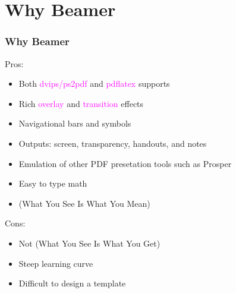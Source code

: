 \section{Why Beamer}
\begin{frame}[fragile]
\frametitle{Why Beamer}

  Pros:

  \begin{itemize}
    \item Both \textcolor{magenta}{dvips/ps2pdf} and \textcolor{magenta}{pdflatex} supports
    \item Rich \textcolor{magenta}{overlay} and \textcolor{magenta}{transition} effects
    \item Navigational bars and symbols
    \item Outputs: screen, transparency, handouts, and notes
    \item Emulation of other PDF presetation tools such as Prosper
    \item Easy to type math
    \item {} (What You See Is What You Mean)
  \end{itemize}

  Cons:

  \begin{itemize}
    \item Not  (What You See Is What You Get)
    \item Steep learning curve
    \item Difficult to design a template
  \end{itemize}

\end{frame}
